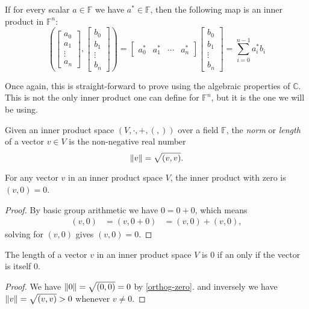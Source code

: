 \begin{prop}
	If for every scalar $a \in \mathbb{F}$ we have $a^* \in \mathbb{F}$, then the following map is an inner product in $\mathbb{F}^n$:
\[
\left(
\left[\begin{matrix} a_0\\a_1\\\vdots\\a_n\end{matrix}\right]
,
\left[\begin{matrix} b_0\\b_1\\\vdots\\b_n\end{matrix}\right]
\right)
=
\left[\begin{matrix} a_0^*&a_1^*&\cdots&a_n^*\end{matrix}\right]
\left[\begin{matrix} b_0\\b_1\\\vdots\\b_n\end{matrix}\right]
= \sum_{i=0}^{n-1} a_i^*b_i
\]
\end{prop}
Once again, this is straight-forward to prove using the algebraic properties of $\mathbb{C}$. This is not the only inner product one can define for $\mathbb{F}^n$, but it is the one we will be using.

\begin{define}[Norm]
	Given an inner product space $(V, \cdot, + , (,))$ over a field $\mathbb{F}$, the \emph{norm} or \emph{length} of a vector $v \in V$ is the non-negative real number
	\[\left\Vert v \right\Vert = \sqrt{(v,v)}.\]
\end{define}

\begin{prop}\label{orthog-zero}
	For any vector $v$ in an inner product space $V$, the inner product with zero is $(v, 0) = 0$.
\end{prop}
\begin{proof}
	By basic group arithmetic we have $0 = 0 + 0$, which means
	\begin{align*}
		(v, 0)
		&= (v, 0+0)
		&= (v,0)+(v,0),
	\end{align*}
	solving for $(v,0)$ gives $(v,0) = 0$.
\end{proof}

\begin{prop}\label{norm-zero}
	 The length of a vector $v$ in an inner product space $V$ is 0 if an only if the vector is itself 0.
\end{prop}
\begin{proof}
	We have $\left\Vert 0 \right\Vert = \sqrt{(0,0)} = 0$ by \autoref{orthog-zero}. and inversely we have $\left\Vert v \right\Vert = \sqrt{(v,v)} > 0$ whenever $v \neq 0$.
\end{proof}

